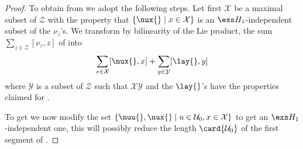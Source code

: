 \begin{proof}
To obtain  from  we adopt the following steps.
Let first $\mathcal{X}$ be a maximal subset of $\mathcal{Z}$ with the property that $\{\nux{}\mid x\in\mathcal{X}\}$ is an
$\exs H_{1}$-independent subset of the $\nu_{z}$'s. We transform by bilinearity of the Lie product,
the sum $\sum_{z\in\mathcal{Z}}[\nu_{z},z]$ %
of  into
%
%
$$ %
\sum_{x\in\mathcal{X}}[\nux{}, x]+\sum_{y\in\mathcal{Y}}[\lay{},y]
$$ %
where $\mathcal{Y}$ is a subset of $\mathcal{Z}$ such that $\mathcal{XY}$ and the $\lay{}$'s have the properties claimed for .

To get  we now modify the set $\{\nuu{},\nux{}\mid u\in\mathcal{U}_{0},x\in\mathcal{X}\}$ to get an
$\exs H_{1}$-independent one, this will possibly reduce the length $\card{\mathcal{U}_{0}}$ of the first segment of .


\end{proof}
